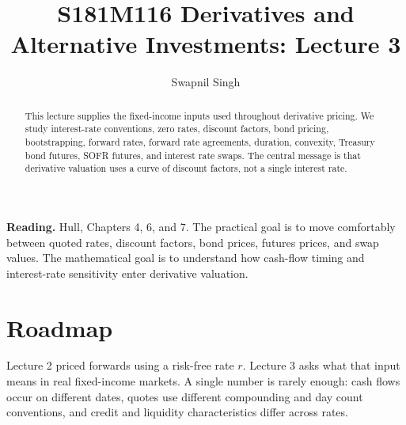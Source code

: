 

\title{S181M116 Derivatives and Alternative Investments: Lecture 3}
\author{Swapnil Singh}
\date{}


\setlength{\headheight}{26pt}
\graphicspath{{images/lecture-3/}}

\newcommand{\PV}{\mathrm{PV}}
\newcommand{\FV}{\mathrm{FV}}
\newcommand{\DF}{\mathrm{DF}}
\newcommand{\bp}{\mathrm{bp}}
\newcommand{\notional}{N}
\newcommand{\FRA}{\mathrm{FRA}}
\newcommand{\SOFR}{\mathrm{SOFR}}
\newcommand{\CF}{\mathrm{CF}}
\newcommand{\CTD}{\mathrm{CTD}}
\newcommand{\Dur}{D}
\newcommand{\Conv}{C}


\maketitle

\begin{abstract}
This lecture supplies the fixed-income inputs used throughout derivative
pricing. We study interest-rate conventions, zero rates, discount factors, bond
pricing, bootstrapping, forward rates, forward rate agreements, duration,
convexity, Treasury bond futures, SOFR futures, and interest rate swaps. The
central message is that derivative valuation uses a curve of discount factors,
not a single interest rate.
\end{abstract}

\begin{boxD}
\textbf{Reading.} Hull, Chapters 4, 6, and 7. The practical goal is to move
comfortably between quoted rates, discount factors, bond prices, futures prices,
and swap values. The mathematical goal is to understand how cash-flow timing and
interest-rate sensitivity enter derivative valuation.
\end{boxD}

\section{Roadmap}

Lecture 2 priced forwards using a risk-free rate $r$. Lecture 3 asks what that
input means in real fixed-income markets. A single number is rarely enough:
cash flows occur on different dates, quotes use different compounding and day
count conventions, and credit and liquidity characteristics differ across rates.

